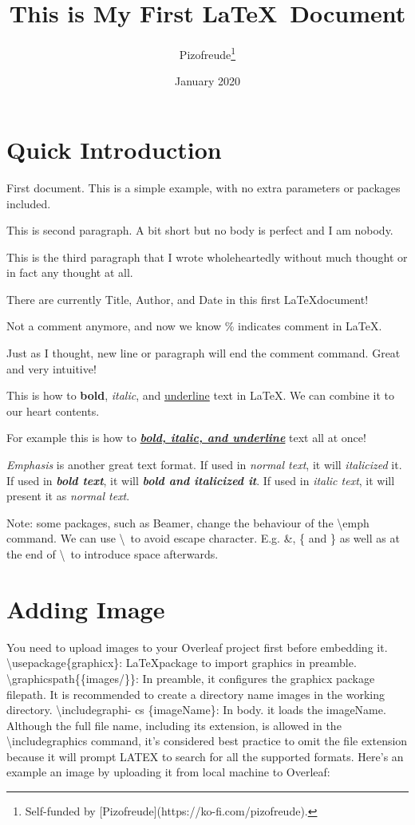 \documentclass[12pt, letterpaper]{article}
\title{This is My First \LaTeX\ Document}
\author{Pizofreude\thanks{Self-funded by [Pizofreude](https://ko-fi.com/pizofreude).}}
\date{January 2020}
\begin{document}
\maketitle

\newpage
\tableofcontents
\newpage

\section{Quick Introduction}

First document. This is a simple example, with no 
extra parameters or packages included.

This is second paragraph. A bit short but no body is perfect and I am nobody.

This is the third paragraph that I wrote wholeheartedly without much thought or in fact any thought at all.

There are currently Title, Author, and Date in this first \LaTeX document!

Not a comment anymore, and now we know \% indicates comment in \LaTeX.

Just as I thought, new line or paragraph will end the comment command. Great and very intuitive!

This is how to \textbf{bold}, \textit{italic}, and \underline{underline} text in \LaTeX. We can combine it to our heart contents.

For example this is how to \textbf{\textit{\underline{bold, italic, and underline}}} text all at once!

\emph{Emphasis} is another great text format. If used in \emph{normal text}, it will \emph{italicized} it. If used in \textbf{\emph{bold text}}, it will \textbf{\emph{bold and italicized it}}. If used in \textit{italic text}, it will present it as \textit{\emph{normal text}}.

Note: some packages, such as Beamer, change the behaviour of the \textbackslash emph command. We can use \textbackslash\ to avoid escape character. E.g. \&, \{ and \} as well as at the end of \textbackslash\ to introduce space afterwards.

\section{Adding Image}

You need to upload images to your Overleaf project first before embedding it.
\textbackslash usepackage\{graphicx\}: \LaTeX package to import graphics in preamble.
\textbackslash graphicspath\{\{images/\}\}: In preamble, it configures the graphicx package filepath. It is recommended to create a directory name images in the working directory.
\textbackslash includegraphi- cs \{imageName\}: In body. it loads the imageName. Although the full file name, including its extension, is allowed in the \textbackslash includegraphics command, it’s considered best practice to omit the file extension because it will prompt LATEX to search for all the supported formats. Here's an example an image by uploading it from local machine to Overleaf:
\end{document}
